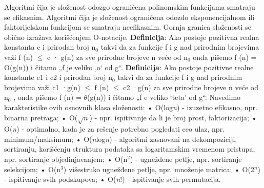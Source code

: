 \documentclass{article}
\begin{document}
\newline Algoritmi čija je složenost odozgo ograničena polinomskim funkcijama smatraju se efikasnim. Algoritmi čija je složenost ograničena odozdo eksponencijalnom ili faktorijelskom funkcijom se smatraju neefikasnim. Gornja granica složenosti se obično izražava korišćenjem O-notacije.
\newline \textbf{Definicija}: Ako postoje pozitivna realna konstanta c i prirodan broj n$_0$ takvi da za funkcije f i g nad prirodnim brojevima važi f (n) $\leq$ c · g(n) za sve prirodne brojeve n veće od n$_0$ onda pišemo
f (n) = O(g(n)) i čitamo „f je veliko ,o‘ od g“.
\newline \textbf{Definicija}: Ako postoje pozitivne realne konstante c1 i c2 i prirodan broj n$_0$ takvi da za funkcije f i g nad prirodnim brojevima važi c1 ·g(n) $\leq$ f (n) $\leq$ c2 ·g(n) za sve prirodne brojeve n veće od n$_0$ , onda pišemo f (n) = $\theta$(g(n)) i čitamo „f e veliko ‘teta’ od g“.
\newline Navedimo karakteristike ovih osnovnih klasa složenosti:
\newline\hspace*{0.4cm}• O(log\textit{n}) - izuzetno efikasno, npr. binarna pretraga;
\newline\hspace*{0.4cm}• O($\sqrt{n}$) - npr. ispitivanje da li je broj prost, faktorizacija;
\newline\hspace*{0.4cm}• O(\textit{n}) - optimalno, kada je za rešenje potrebno pogledati ceo ulaz, npr. minimum/maksimum;
\newline\hspace*{0.4cm}• O(\textit{n}log\textit{n}) - algoritmi
zasnovani na dekompoziciji, sortiranju, korišćenju struktura podataka sa logaritamskim vremenom pristupa, npr. sortiranje objedinjavanjem;
\newline\hspace*{0.4cm}• O(n$^2$) - ugnežđene petlje, npr. sortiranje selekcijom;
\newline\hspace*{0.4cm}• O(n$^3$) višestruko ugnežđene petlje, npr. množenje matrica;
\newline\hspace*{0.4cm}• O(2$^n$) - ispitivanje svih podskupova;
\newline\hspace*{0.4cm}• O(\textit{n}!) - ispitivanje svih permutacija.
\end{document}
